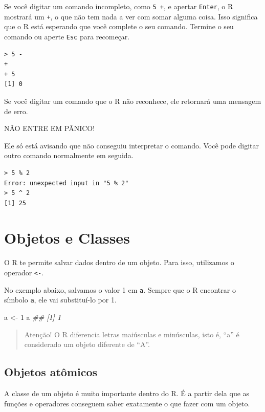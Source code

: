 \documentclass[
]{book}
\newenvironment{Shaded}{\begin{snugshade}}{\end{snugshade}}
\newcommand{\CommentTok}[1]{\textcolor[rgb]{0.56,0.35,0.01}{\textit{#1}}}
\newcommand{\DecValTok}[1]{\textcolor[rgb]{0.00,0.00,0.81}{#1}}
\newcommand{\NormalTok}[1]{#1}
\newcommand{\StringTok}[1]{\textcolor[rgb]{0.31,0.60,0.02}{#1}}
\begin{document}
Se você digitar um comando incompleto, como \texttt{5\ +}, e apertar \texttt{Enter}, o R mostrará um \texttt{+}, o que não tem nada a ver com somar alguma coisa. Isso significa que o R está esperando que você complete o seu comando. Termine o seu comando ou aperte \texttt{Esc} para recomeçar.

\begin{verbatim}
> 5 -
+ 
+ 5
[1] 0
\end{verbatim}

Se você digitar um comando que o R não reconhece, ele retornará uma mensagem de erro.

NÃO ENTRE EM PÂNICO!

Ele só está avisando que não conseguiu interpretar o comando. Você pode digitar outro comando normalmente em seguida.

\begin{verbatim}
> 5 % 2
Error: unexpected input in "5 % 2"
> 5 ^ 2
[1] 25
\end{verbatim}

\hypertarget{objetos-e-classes}{%
\section{Objetos e Classes}\label{objetos-e-classes}}

O R te permite salvar dados dentro de um objeto. Para isso, utilizamos o operador \texttt{\textless{}-}.

No exemplo abaixo, salvamos o valor 1 em \texttt{a}. Sempre que o R encontrar o símbolo \texttt{a}, ele vai substituí-lo por 1.

\begin{Shaded}
\begin{Highlighting}[]
\NormalTok{a <-}\StringTok{ }\DecValTok{1}
\NormalTok{a}
\CommentTok{## [1] 1}
\end{Highlighting}
\end{Shaded}

\begin{quote}
Atenção! O R diferencia letras maiúsculas e minúsculas, isto é, ``a'' é considerado um objeto diferente de ``A''.
\end{quote}

\hypertarget{objetos-atuxf4micos}{%
\subsection{Objetos atômicos}\label{objetos-atuxf4micos}}

A classe de um objeto é muito importante dentro do R. É a partir dela que as funções e operadores conseguem saber exatamente o que fazer com um objeto.
\end{document}
